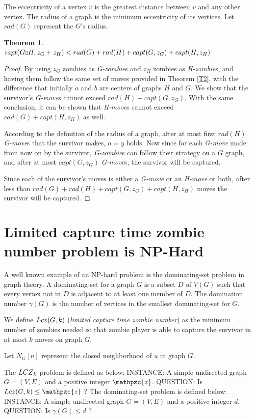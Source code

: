 \documentclass[1p]{elsarticle}
\newtheorem{theorem}{Theorem}
\newcommand{\NPZ}{\ooalign{$Z$\cr\hfil\rule[.8ex]{.3em}{.09ex}\hfil\cr}}
\newcommand{\zn}{\ooalign{$z$\cr\hfil\rule[.5ex]{.2em}{.08ex}\hfil\cr}}
\newcommand{\sq}[1][black]{%
\begin{tikzpicture}                                                           
  \draw[#1] (2pt,0pt) -- (6pt,0pt);   
  \draw[#1] (2pt,0pt) -- (2pt,4pt);    
  \draw[#1] (2pt,4pt) -- (6pt,4pt);   
  \draw[#1] (6pt,0pt) -- (6pt,4pt);
\end{tikzpicture}%
}
\begin{document}
	The eccentricity of a vertex $v$ is the greatest distance between $v$ and any other vertex. The radius of a graph is the
	minimum eccentricity of its vertices. Let $rad(G)$ represent the $G$'s radius.
	\begin{theorem}
		\label{T5}
		$capt( G \sq H, z_G + z_H ) < rad(G) + rad(H) + capt(G, z_G) + capt(H, z_H)$
	\end{theorem}
	\begin{proof}
		By using $z_G$ zombies as {\it G-zombie}s and $z_H$ zombies as {\it H-zombie}s, and having them follow the same
		set of moves provided in Theorem \ref{T2}, with the difference that initially $a$ and $b$ are centers of graphs
		$H$ and $G$. We show that the survivor's {\it G-move}s cannot exceed $rad(H) + capt(G, z_G)$. With the same
		conclusion, it can be shown that {\it H-move}s cannot exceed $rad(G) + capt(H, z_H)$ as well.

		According to the definition of the radius of a graph, after at most first $rad(H)$ {\it G-move}s that the
		survivor makes, $a = y$ holds. Now since for each {\it G-move} made from now on by the survivor, {\it G-zombie}s
		can follow their strategy on a $G$ graph, and after at most $capt(G,z_G)$ {\it G-move}s, the survivor will be
		captured. 
		
		Since each of the survivor's moves is either a {\it G-move} or an {\it H-move} or both, after less than $rad(G)
		+ rad(H) + capt(G, z_G) + capt(H, z_H)$ moves the survivor will be captured.
	\end{proof}
\section{Limited capture time zombie number problem is NP-Hard}\label{np-capturetime} 

	A well known example of an NP-hard problem is the dominating-set problem in graph theory\cite{Hopcroft07}. A
	dominating-set for a graph $G$ is a subset $D$ of $V(G)$ such that every vertex not in $D$ is adjacent to at least
	one member of $D$. The domination number $\gamma(G)$ is the number of vertices in the smallest dominating-set for
	$G$.

	We define $Lc\zn(G,k)$ ({\it limited capture time zombie number}) as the minimum number of zombies needed so that
	zombie player is able to capture the survivor in at most $k$ moves on graph $G$. 

	Let $N_G[u]$ represent the closed neighborhood of $u$ in graph $G$.
	
	The $LC\NPZ_k$ problem is defined as below:
	{\newline}
	INSTANCE: A simple undirected graph $G = (V,E)$ and a positive integer $\mathpzc{z}$.
	{\newline}
	QUESTION: Is $Lc\zn(G,k) \leq \mathpzc{z}$ ?
	{\newline}
	{\newline}
	The dominating-set problem is defined below:
	{\newline}
	INSTANCE: A simple undirected graph $G = (V,E)$ and a positive integer $d$.
	{\newline}
	QUESTION: Is $\gamma(G) \leq d$ ?
\end{document}
